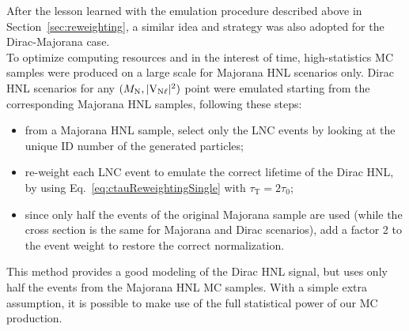 After the lesson learned with the emulation procedure described 
above in Section~\ref{sec:reweighting}, a similar idea and strategy
was also adopted for the Dirac-Majorana case.\\
To optimize computing resources and in the interest of time,
high-statistics MC samples were produced on a large scale for Majorana
HNL scenarios only.
Dirac HNL scenarios for any $(M_{\mathrm{N}},\mathrm{|V_{\mathrm{N}\ell}|^2})$ point were emulated
starting from the corresponding Majorana HNL samples, following these
steps:
\begin{itemize}
\setlength\itemsep{-0.2em}
\item from a Majorana HNL sample, select only the LNC events by
  looking at the unique ID number of the generated particles;
\item re-weight each LNC event to emulate the correct lifetime of the
  Dirac HNL, by using Eq.~\ref{eq:ctauReweightingSingle} with
  $\tau_{\mathrm{T}}=2\tau_0$;
\item since only half the events of the original Majorana sample are
  used (while the cross section is the same for Majorana and Dirac
  scenarios), add a factor 2 to the event weight to restore the correct
  normalization.
\end{itemize}
This method provides a good modeling of the Dirac HNL signal, but
uses only half the events from the Majorana HNL MC samples. With a
simple extra assumption, it is possible to make use of the full
statistical power of our MC production.

